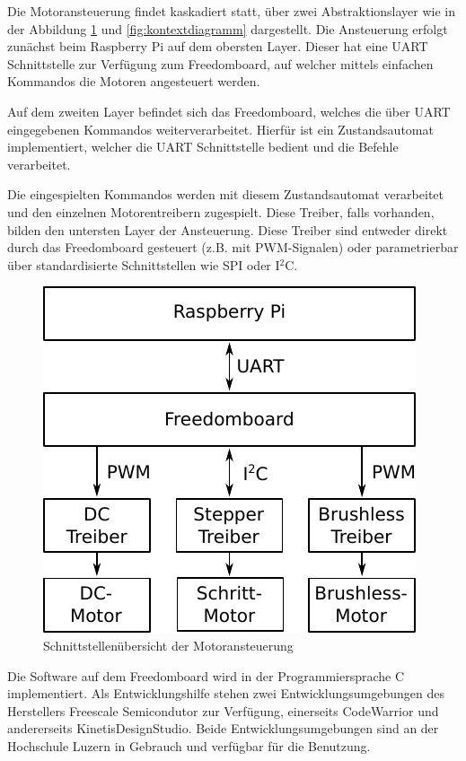 Die Motoransteuerung findet kaskadiert statt, über zwei Abstraktionslayer
wie in der Abbildung \ref{fig:motor-control-overview} und 
\ref{fig:kontextdiagramm} dargestellt. Die Ansteuerung erfolgt zunächst
beim Raspberry Pi auf dem obersten Layer. Dieser hat eine UART
Schnittstelle zur Verfügung zum Freedomboard, auf welcher mittels
einfachen Kommandos die Motoren angesteuert werden. 

Auf dem zweiten Layer befindet sich das Freedomboard, welches die über UART
eingegebenen Kommandos weiterverarbeitet. Hierfür ist ein Zustandsautomat
implementiert, welcher die UART Schnittstelle bedient und die Befehle
verarbeitet.

Die eingespielten Kommandos werden mit diesem Zustandsautomat verarbeitet und
den einzelnen Motorentreibern zugespielt. Diese Treiber, falls vorhanden,
bilden den untersten Layer der Ansteuerung. Diese Treiber sind entweder
direkt durch das Freedomboard gesteuert (z.B. mit PWM-Signalen) oder 
parametrierbar über standardisierte Schnittstellen wie SPI oder I$^2$C.

\begin{figure}[h!]
	\centering
	\includegraphics[scale=1]{../../fig/motor-control-overview.pdf}
	\caption{Schnittstellenübersicht der Motoransteuerung}
	\label{fig:motor-control-overview}
\end{figure}

Die Software auf dem Freedomboard wird in der Programmiersprache C
implementiert. Als Entwicklungshilfe stehen zwei Entwicklungsumgebungen
des Herstellers Freescale Semicondutor zur Verfügung, einerseits CodeWarrior
und andererseits KinetisDesignStudio. Beide Entwicklungsumgebungen sind
an der Hochschule Luzern in Gebrauch und verfügbar für die Benutzung.
